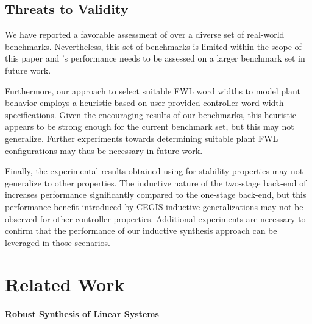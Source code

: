 \documentclass[final]{sig-alternate-05-2015}
\begin{document}
\subsection{Threats to Validity}

We have reported a favorable assessment of \tool over a diverse set of
real-world benchmarks.  Nevertheless, this set of benchmarks is limited
within the scope of this paper and \tool's performance needs to be assessed
on a larger benchmark set in future work.

Furthermore, our approach to select suitable FWL word widths to model
plant behavior employs a heuristic based on user-provided controller
word-width specifications.  Given the encouraging results of our benchmarks,
this heuristic appears to be strong enough for the current benchmark set,
but this may not generalize.  Further experiments towards determining
suitable plant FWL configurations may thus be necessary in future work.

Finally, the experimental results obtained using \tool for stability
properties may not generalize to other properties.  The inductive nature of
the two-stage back-end of \tool increases performance significantly compared
to the one-stage back-end, but this performance benefit introduced by CEGIS 
inductive generalizations may not be observed for other controller 
properties.  Additional experiments are necessary to confirm that the
performance of our inductive synthesis approach can be leveraged in those
scenarios.

\section{Related Work}\label{sec:related}

\paragraph{Robust Synthesis of Linear Systems} 
\end{document}
